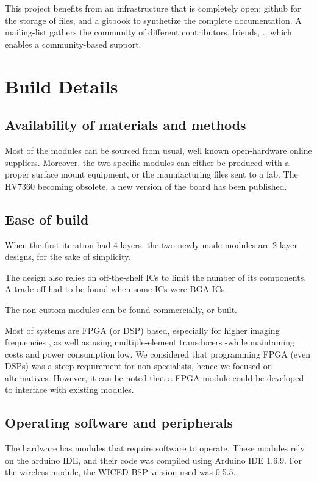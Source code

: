 \documentclass[letterpaper, 10 pt, conference]{ieeeconf} %
\begin{document}
This project benefits from an infrastructure that is completely open: github for the storage of files, and a gitbook to synthetize the complete documentation. A mailing-list gathers the community of different contributors, friends, .. which enables a community-based support.

\section{Build Details}

\subsection{Availability of materials and methods}

Most of the modules can be sourced from usual, well known open-hardware online suppliers. Moreover, the two specific modules can either be produced with a proper surface mount equipment, or the manufacturing files sent to a fab. The HV7360 becoming obsolete, a new version of the board has been published.

\subsection{ Ease of build}

When the first iteration had 4 layers, the two newly made modules are 2-layer designs, for the sake of simplicity.

The design also relies on off-the-shelf ICs to limit the number of its components. A trade-off had to be found when some ICs were BGA ICs.

The non-custom modules can be found commercially, or built.

Most of systems are FPGA (or DSP) based, especially for higher imaging frequencies \cite{c4,c5}, as well as using multiple-element transducers \cite{c7} -while maintaining costs and power consumption low. We considered that programming FPGA (even DSPs) was a steep requirement for non-specialists, hence we focused on alternatives. However, it can be noted that a FPGA module could be developed to interface with existing modules. 

\subsection{ Operating software and peripherals}

The hardware has modules that require software to operate. These modules rely on the arduino IDE, and their code was compiled using Arduino IDE 1.6.9. For the wireless module, the WICED BSP version used was 0.5.5.
\end{document}
